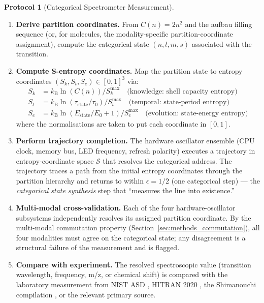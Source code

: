 \documentclass[11pt,a4paper]{article}
\theoremstyle{stmtstyle}
\theoremstyle{definition}
\newtheorem{protocol}{Protocol}
\theoremstyle{remark}
\newcommand{\kB}{k_{\mathrm{B}}}
\newcommand{\Sk}{S_{k}}
\newcommand{\St}{S_{t}}
\newcommand{\Se}{S_{e}}
\newcommand{\Sspace}{\mathcal{S}}
\begin{document}
\begin{protocol}[Categorical Spectrometer Measurement]\label{prot:measurement}
\begin{enumerate}[label=\textbf{Step \arabic*:},leftmargin=*]
\item \textbf{Derive partition coordinates.} From $C(n) = 2n^{2}$ and the aufbau filling sequence (or, for molecules, the modality-specific partition-coordinate assignment), compute the categorical state $(n, l, m, s)$ associated with the transition.

\item \textbf{Compute S-entropy coordinates.} Map the partition state to entropy coordinates $(\Sk, \St, \Se) \in [0,1]^{3}$ via:
\begin{align}
\Sk &= \kB \ln(C(n)) / \Sk^{\max} \quad \text{(knowledge: shell capacity entropy)} \\
\St &= \kB \ln(\tau_{\mathrm{state}} / \tau_{0}) / \St^{\max} \quad \text{(temporal: state-period entropy)} \\
\Se &= \kB \ln(E_{\mathrm{state}} / E_{0} + 1) / \Se^{\max} \quad \text{(evolution: state-energy entropy)}
\end{align}
where the normalisations are taken to put each coordinate in $[0,1]$.

\item \textbf{Perform trajectory completion.} The hardware oscillator ensemble (CPU clock, memory bus, LED frequency, refresh polarity) executes a trajectory in entropy-coordinate space $\Sspace$ that resolves the categorical address. The trajectory traces a path from the initial entropy coordinates through the partition hierarchy and returns to within $\epsilon = 1/2$ (one categorical step) --- the \emph{categorical state synthesis} step that ``measures the line into existence.''

\item \textbf{Multi-modal cross-validation.} Each of the four hardware-oscillator subsystems independently resolves its assigned partition coordinate. By the multi-modal commutation property (Section~\ref{sec:methods_commutation}), all four modalities must agree on the categorical state; any disagreement is a structural failure of the measurement and is flagged.

\item \textbf{Compare with experiment.} The resolved spectroscopic value (transition wavelength, frequency, m/z, or chemical shift) is compared with the laboratory measurement from NIST ASD \citep{nistasd2023}, HITRAN 2020 \citep{hitran2020}, the Shimanouchi compilation \citep{shimanouchi1972}, or the relevant primary source.
\end{enumerate}
\end{protocol}
\end{document}

